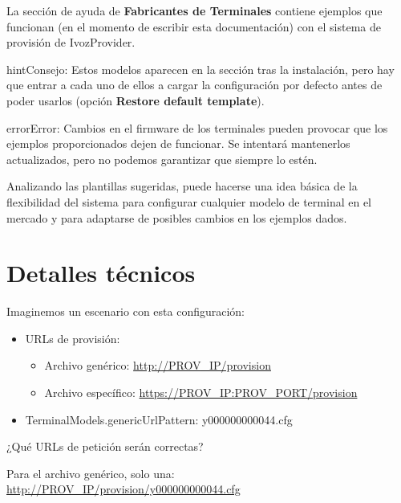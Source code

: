 \documentclass[letterpaper,10pt,spanish]{sphinxmanual}
\begin{document}
La sección de ayuda de \textbf{Fabricantes de Terminales} contiene ejemplos que funcionan (en el momento de escribir esta documentación) con el sistema de provisión de IvozProvider.

\begin{notice}{hint}{Consejo:}
Estos modelos aparecen en la sección tras la instalación, pero hay que entrar a cada uno de ellos a cargar la configuración por defecto antes de poder usarlos (opción \textbf{Restore default template}).
\end{notice}

\begin{notice}{error}{Error:}
Cambios en el firmware de los terminales pueden provocar que los ejemplos proporcionados dejen de funcionar. Se intentará mantenerlos actualizados, pero no podemos garantizar que siempre lo estén.
\end{notice}

Analizando las plantillas sugeridas, puede hacerse una idea básica de la flexibilidad del sistema para configurar cualquier modelo de terminal en el mercado y para adaptarse de posibles cambios en los ejemplos dados.


\section{Detalles técnicos}
\label{provisioning/index:getting-technical}
Imaginemos un escenario con esta configuración:
\begin{itemize}
\item {} 
URLs de provisión:
\begin{itemize}
\item {} 
Archivo genérico: \url{http://PROV\_IP/provision}

\item {} 
Archivo específico: \url{https://PROV\_IP:PROV\_PORT/provision}

\end{itemize}

\item {} 
TerminalModels.genericUrlPattern: y000000000044.cfg

\end{itemize}

¿Qué URLs de petición serán correctas?

Para el archivo genérico, solo una: \url{http://PROV\_IP/provision/y000000000044.cfg}
\end{document}
